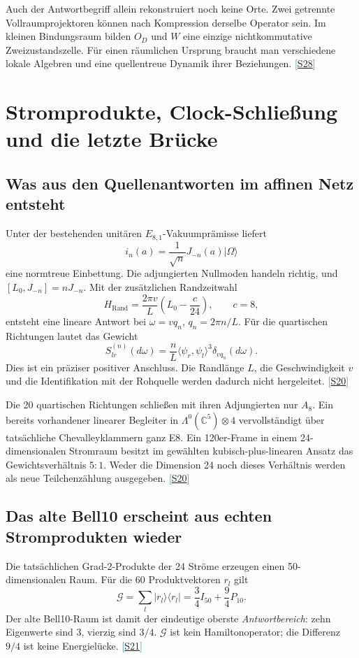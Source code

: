 \documentclass[11pt,a4paper,oneside,parskip=half,headings=normal,numbers=noenddot,bibliography=totoc]{scrreprt}
\newcommand{\C}{\mathbb C}
\newcommand{\ket}[1]{\lvert #1\rangle}
\newcommand{\bra}[1]{\langle #1\rvert}
\newcommand{\src}[1]{\textcolor{teal}{\small[\hyperref[s:#1]{S#1}]}}
\begin{document}
Auch der Antwortbegriff allein rekonstruiert noch keine Orte. Zwei getrennte Vollraumprojektoren können nach Kompression derselbe Operator sein. Im kleinen Bindungsraum bilden $O_D$ und $W$ eine einzige nichtkommutative Zweizustandszelle. Für einen räumlichen Ursprung braucht man verschiedene lokale Algebren und eine quellentreue Dynamik ihrer Beziehungen. \src{28}

\chapter{Stromprodukte, Clock-Schließung und die letzte Brücke}
\section{Was aus den Quellenantworten im affinen Netz entsteht}
Unter der bestehenden unitären $E_{8,1}$-Vakuumprämisse liefert
\[
 i_n(a)=\frac1{\sqrt n}J_{-n}(a)\ket\Omega
\]
eine normtreue Einbettung. Die adjungierten Nullmoden handeln richtig, und $[L_0,J_{-n}]=nJ_{-n}$. Mit der zusätzlichen Randzeitwahl
\[
 H_{\mathrm{Rand}}=\frac{2\pi v}{L}\left(L_0-\frac c{24}\right),
 \qquad c=8,
\]
entsteht eine lineare Antwort bei $\omega=vq_n$, $q_n=2\pi n/L$. Für die quartischen Richtungen lautet das Gewicht
\[
 S_{lr}^{(n)}(d\omega)=\frac nL
 \langle\psi_r,\psi_l\rangle^3\delta_{vq_n}(d\omega).
\]
Dies ist ein präziser positiver Anschluss. Die Randlänge $L$, die Geschwindigkeit $v$ und die Identifikation mit der Rohquelle werden dadurch nicht hergeleitet. \src{20}

Die 20 quartischen Richtungen schließen mit ihren Adjungierten nur $A_8$. Ein bereits vorhandener linearer Begleiter in $\Lambda^0(\C^5)\otimes4$ vervollständigt über tatsächliche Chevalleyklammern ganz E8. Ein 120er-Frame in einem 24-dimensionalen Stromraum besitzt im gewählten kubisch-plus-linearen Ansatz das Gewichtsverhältnis $5:1$. Weder die Dimension 24 noch dieses Verhältnis werden als neue Teilchenzählung ausgegeben. \src{20}

\section{Das alte Bell10 erscheint aus echten Stromprodukten wieder}
Die tatsächlichen Grad-2-Produkte der 24 Ströme erzeugen einen 50-dimensionalen Raum. Für die 60 Produktvektoren $r_l$ gilt
\[
 \mathcal G=\sum_l\ket{r_l}\bra{r_l}
 =\frac34I_{50}+\frac94P_{10}.
\]
Der alte Bell10-Raum ist damit der eindeutige oberste \emph{Antwortbereich}: zehn Eigenwerte sind $3$, vierzig sind $3/4$. $\mathcal G$ ist kein Hamiltonoperator; die Differenz $9/4$ ist keine Energielücke. \src{21}
\end{document}
